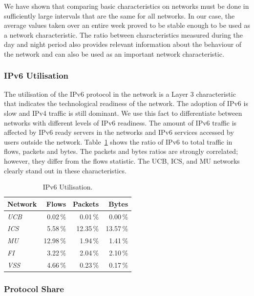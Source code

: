 We have shown that comparing basic characteristics on networks must be done in sufficiently large intervals that are the same for all networks. In our case, the average values taken over an entire week proved to be stable enough to be used as a network characteristic. The ratio between characteristics measured during the day and night period also provides relevant information about the behaviour of the network and can also be used as an important network characteristic.


\subsubsection{IPv6 Utilisation}

The utilisation of the IPv6 protocol in the network is a Layer 3 characteristic that indicates the technological readiness of the network. The adoption of IPv6 is slow and IPv4 traffic is still dominant. We use this fact to differentiate between networks with different levels of IPv6 readiness. The amount of IPv6 traffic is affected by IPv6 ready servers in the networks and IPv6 services accessed by users outside the network. Table~\ref{tab:characterization-ipv6-utilization} shows the ratio of IPv6 to total traffic in flows, packets and bytes. The packets and bytes ratios are strongly correlated; however, they differ from the flows statistic. The UCB, ICS, and MU networks clearly stand out in these characteristics.

\begin{table}[!t]
        \centering
        \renewcommand{\arraystretch}{1.1}
        \begin{tabular}{|l|r|r|r|} \hline
 \textbf{Network} & \textbf{Flows} & \textbf{Packets} & \textbf{Bytes} \\ \hline
 \textit{UCB} & 0.02\,\% & 0.01\,\% & 0.00\,\% \\ \hline
 \textit{ICS} & 5.58\,\% & 12.35\,\% & 13.57\,\% \\ \hline
 \textit{MU} & 12.98\,\% & 1.94\,\% & 1.41\,\% \\ \hline
 \textit{FI} & 3.22\,\% & 2.04\,\% & 2.10\,\% \\ \hline
 \textit{VSS} & 4.66\,\% & 0.23\,\% & 0.17\,\% \\ \hline
        \end{tabular}
        \caption{IPv6 Utilisation.}
        \label{tab:characterization-ipv6-utilization}
\end{table}


\subsubsection{Protocol Share}

